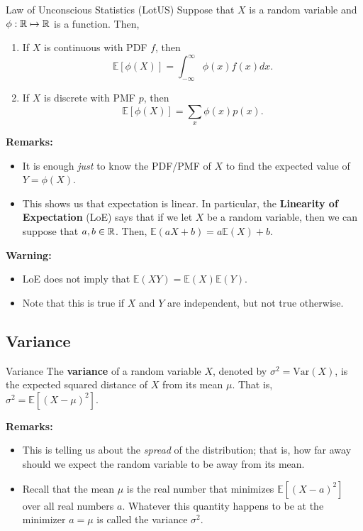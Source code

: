 \begin{theorem}{Law of Unconscious Statistics (LotUS)}{}
    Suppose that $X$ is a random variable and $\phi: \mathbb{R} \mapsto \mathbb{R}$ is a function. Then, 
    \begin{enumerate}
        \item If $X$ is continuous with PDF $f$, then 
        \[\mathbb{E}[\phi(X)] = \int_{-\infty}^{\infty} \phi(x) f(x) dx.\]

        \item If $X$ is discrete with PMF $p$, then 
        \[\mathbb{E}[\phi(X)] = \sum_{x} \phi(x) p(x).\]
    \end{enumerate}
\end{theorem}
\textbf{Remarks:} 
\begin{itemize}
    \item It is enough \emph{just} to know the PDF/PMF of $X$ to find the expected value of $Y = \phi(X)$.
    \item This shows us that expectation is linear. In particular, the \textbf{Linearity of Expectation} (LoE) says that if we let $X$ be a random variable, then we can suppose that $a, b \in \mathbb{R}$. Then, $\mathbb{E}(aX + b) = a\mathbb{E}(X) + b$. 
\end{itemize}
\textbf{Warning:}
\begin{itemize}
    \item LoE does not imply that $\mathbb{E}(XY) = \mathbb{E}(X) \mathbb{E}(Y)$. 
    \item Note that this is true if $X$ and $Y$ are independent, but not true otherwise. 
\end{itemize}

\subsection{Variance}
\begin{definition}{Variance}{}
    The \textbf{variance} of a random variable $X$, denoted by $\sigma^2 = \text{Var}(X)$, is the expected squared distance of $X$ from its mean $\mu$. That is, $\sigma^2 = \mathbb{E}[(X - \mu)^2]$. 
\end{definition}
\textbf{Remarks:}
\begin{itemize}
    \item This is telling us about the \emph{spread} of the distribution; that is, how far away should we expect the random variable to be away from its mean. 
    \item Recall that the mean $\mu$ is the real number that minimizes $\mathbb{E}[(X - a)^2]$ over all real numbers $a$. Whatever this quantity happens to be at the minimizer $a = \mu$ is called the variance $\sigma^2$. 
\end{itemize}

